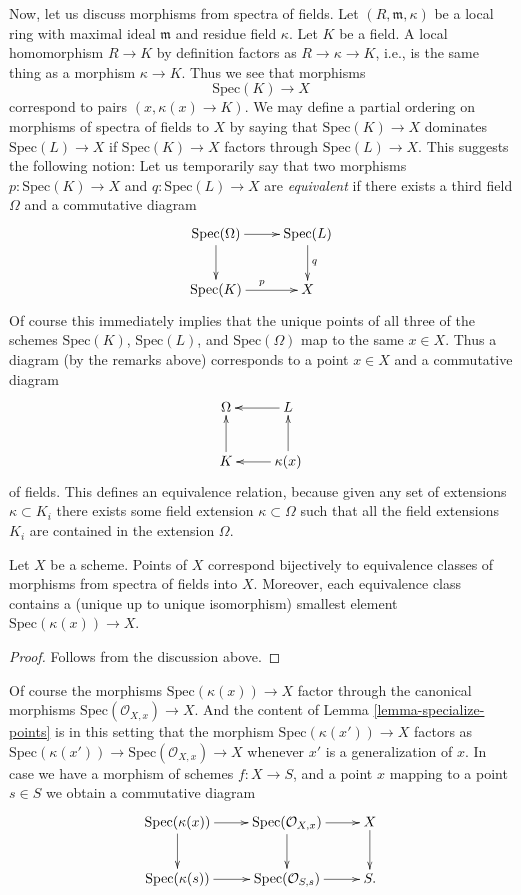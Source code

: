 \noindent
Now, let us discuss morphisms from spectra of fields.
Let $(R, \mathfrak m, \kappa)$ be a local ring
with maximal ideal $\mathfrak m$ and residue field $\kappa$.
Let $K$ be a field. A local homomorphism $R \to K$ by definition
factors as $R \to \kappa \to K$, i.e., is the same thing as
a morphism $\kappa \to K$. Thus we see that morphisms
$$
\text{Spec}(K) \longrightarrow X
$$
correspond to pairs $(x, \kappa(x) \to K)$. We may define
a partial ordering on morphisms of spectra of fields to $X$
by saying that $\text{Spec}(K) \to X$ dominates
$\text{Spec}(L) \to X$ if $\text{Spec}(K) \to X$
factors through $\text{Spec}(L) \to X$. This suggests
the following notion: Let us temporarily
say that two morphisms $p : \text{Spec}(K) \to X$ and
$q : \text{Spec}(L) \to X$ are {\it equivalent} if there exists
a third field $\Omega$ and a commutative diagram
$$
\xymatrix{
\text{Spec}(\Omega) \ar[r] \ar[d] &
\text{Spec}(L) \ar[d]^q \\
\text{Spec}(K) \ar[r]^p &
X
}
$$
Of course this immediately implies that the unique points of
all three of the schemes $\text{Spec}(K)$,
$\text{Spec}(L)$, and $\text{Spec}(\Omega)$
map to the same $x \in X$. Thus a diagram (by the remarks above)
corresponds to a point $x \in X$ and a commutative diagram
$$
\xymatrix{
\Omega &
L \ar[l] \\
K \ar[u] &
\kappa(x) \ar[l] \ar[u]
}
$$
of fields. This defines an equivalence relation, because given
any set of extensions $\kappa \subset K_i$ there exists
some field extension $\kappa \subset \Omega$ such that all
the field extensions $K_i$ are contained in the extension $\Omega$.

\begin{lemma}
\label{lemma-characterize-points}
Let $X$ be a scheme. Points of $X$ correspond bijectively
to equivalence classes of morphisms from spectra of
fields into $X$. Moreover, each equivalence class contains
a (unique up to unique isomorphism) smallest element
$\text{Spec}(\kappa(x)) \to X$.
\end{lemma}

\begin{proof}
Follows from the discussion above.
\end{proof}

\noindent
Of course the morphisms $\text{Spec}(\kappa(x)) \to X$
factor through the canonical morphisms
$\text{Spec}(\mathcal{O}_{X, x}) \to X$.
And the content of Lemma \ref{lemma-specialize-points} is in
this setting that the morphism $\text{Spec}(\kappa(x')) \to X$
factors as
$\text{Spec}(\kappa(x')) \to \text{Spec}(\mathcal{O}_{X, x}) \to X$
whenever $x'$ is a generalization of $x$.
In case we have a morphism of schemes $f : X \to S$,
and a point $x$ mapping to a point $s \in S$ we obtain
a commutative diagram
$$
\xymatrix{
\text{Spec}(\kappa(x)) \ar[r] \ar[d] &
\text{Spec}(\mathcal{O}_{X, x}) \ar[r] \ar[d] &
X \ar[d] \\
\text{Spec}(\kappa(s)) \ar[r] &
\text{Spec}(\mathcal{O}_{S, s}) \ar[r] &
S.
}
$$










